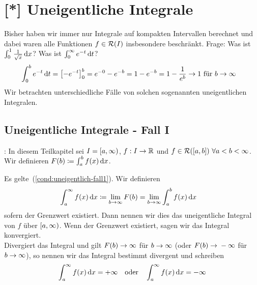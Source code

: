 \section{[*] Uneigentliche Integrale}
\thispagestyle{pagenumberonly}

Bisher haben wir immer nur Integrale auf kompakten Intervallen berechnet und dabei waren alle Funktionen $f\in\mR\of{I}$ insbesondere beschränkt. Frage: Was ist $\int_{0}^{1} \frac{1}{\sqrt{x}} \mathop{}\!\mathrm{d} x$? Was ist $ \int_{0}^{\infty} e^{-t} \mathop{}\!\mathrm{d} t$?
\begin{align*}
    \int_{0}^{b} e^{-t} \mathop{}\!\mathrm{d} t &= \left[-e^{-t}\right]_0^b = e^{-0} - e^{-b} = 1 - e^{-b} = 1 -\frac{1}{e^b}\rightarrow{} 1 \text{ für } b\rightarrow{}\infty
\end{align*}
Wir betrachten unterschiedliche Fälle von solchen sogenannten uneigentlichen Integralen.

\subsection{Uneigentliche Integrale - Fall I}

\begin{mdframed}
    : In diesem Teilkapitel sei $I=\left[a, \infty\right)$, $f: I\to\mathbb{R}$ und $f\in\mR\of{\interv{a,b}}~\forall a < b < \infty$. Wir definieren $F\of{b} \coloneqq \int_{a}^{b} f\of{x} \dif x$.
\end{mdframed}

\begin{definition}
    Es gelte~(\ref{cond:uneigentlich-fall1}). Wir definieren
    \begin{align*}
        \int_{a}^{\infty} f\of{x} \dif x &\coloneqq \lim_{b\toinf} F\of{b} = \lim_{b\toinf} \int_{a}^{b} f\of{x} \dif x
    \end{align*}
    sofern der Grenzwert existiert. Dann nennen wir dies das uneigentliche Integral von $f$ über $\left[a,\infty\right)$. Wenn der Grenzwert existiert, sagen wir das Integral konvergiert.\\
    Divergiert das Integral und gilt $F\of{b}\toinf$ für $b\rightarrow{}\infty$ (oder $F\of{b}\fromto -\infty$ für $b\rightarrow{}\infty$), so nennen wir das Integral bestimmt divergent und schreiben
    \begin{align*}
        \int_{a}^{\infty} f\of{x} \dif x = +\infty\quad\text{oder}\quad\int_{a}^{\infty} f\of{x} \dif x = -\infty
    \end{align*}
\end{definition}

